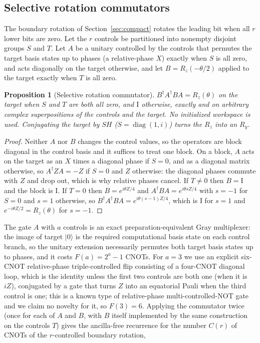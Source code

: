 \documentclass[11pt]{article}
\newtheorem{proposition}{Proposition}
\DeclareMathOperator{\diag}{diag}
\newcommand{\ket}[1]{\lvert #1\rangle}
\newcommand{\id}{\mathrm{I}}
\begin{document}
\subsection{Selective rotation commutators}
The boundary rotation of Section~\ref{sec:compact} rotates the leading bit when all $r$ lower bits are zero. Let the $r$ controls be partitioned into nonempty disjoint groups $S$ and $T$. Let $A$ be a unitary controlled by the controls that permutes the target basis states up to phases (a relative-phase $X$) exactly when $S$ is all zero, and acts diagonally on the target otherwise, and let $B=R_z(-\theta/2)$ applied to the target exactly when $T$ is all zero.
\begin{proposition}[Selective rotation commutator]\label{prop:commutator}
$B^\dagger A^\dagger BA=R_z(\theta)$ on the target when $S$ and $T$ are both all zero, and $\id$ otherwise, exactly and on arbitrary complex superpositions of the controls and the target. No initialized workspace is used. Conjugating the target by $S H$ ($S=\diag(1,i)$) turns the $R_z$ into an $R_y$.
\end{proposition}
\begin{proof}
Neither $A$ nor $B$ changes the control values, so the operators are block diagonal in the control basis and it suffices to treat one block. On a block, $A$ acts on the target as an $X$ times a diagonal phase if $S=0$, and as a diagonal matrix otherwise, so $A^\dagger ZA=-Z$ if $S=0$ and $Z$ otherwise: the diagonal phases commute with $Z$ and drop out, which is why relative phases cancel. If $T\ne0$ then $B=\id$ and the block is $\id$. If $T=0$ then $B=e^{i\theta Z/4}$ and $A^\dagger BA=e^{i\theta sZ/4}$ with $s=-1$ for $S=0$ and $s=1$ otherwise, so $B^\dagger A^\dagger BA=e^{i\theta(s-1)Z/4}$, which is $\id$ for $s=1$ and $e^{-i\theta Z/2}=R_z(\theta)$ for $s=-1$.
\end{proof}
The gate $A$ with $a$ controls is an exact preparation-equivalent Gray multiplexer: the image of target $\ket0$ is the required computational basis state on each control branch, so the unitary extension necessarily permutes both target basis states up to phases, and it costs $F(a)=2^a-1$ CNOTs. For $a=3$ we use an explicit six-CNOT relative-phase triple-controlled flip consisting of a four-CNOT diagonal loop, which is the identity unless the first two controls are both one (when it is $iZ$), conjugated by a gate that turns $Z$ into an equatorial Pauli when the third control is one; this is a known type of relative-phase multi-controlled-NOT gate and we claim no novelty for it, so $F(3)=6$. Applying the commutator twice (once for each of $A$ and $B$, with $B$ itself implemented by the same construction on the controls $T$) gives the ancilla-free recurrence for the number $C(r)$ of CNOTs of the $r$-controlled boundary rotation,
\end{document}
